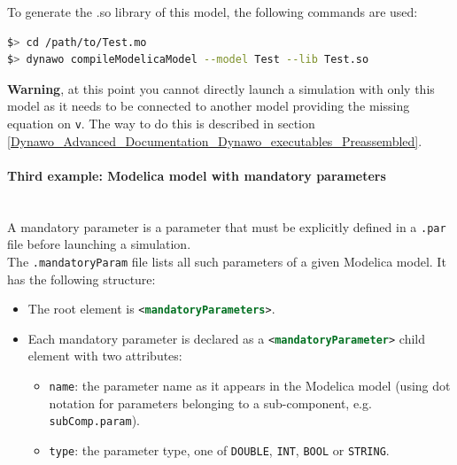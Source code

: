 \documentclass[a4paper, 12pt]{report}
\begin{document}


To generate the .so library of this model, the following commands are used:
\begin{lstlisting}[language=bash,deletekeywords={jobs,help}]
$> cd /path/to/Test.mo
$> dynawo compileModelicaModel --model Test --lib Test.so
\end{lstlisting}

\textbf{Warning}, at this point you cannot directly launch a simulation with only this model as it needs to be connected to another model providing the missing equation on \lstinline[language=Modelica]{v}. The way to do this is described in section \ref{Dynawo_Advanced_Documentation_Dynawo_executables_Preassembled}.

\paragraph{Third example: Modelica model with mandatory parameters}
\label{Dynawo_Advanced_Documentation_Dynawo_executables_execDynawo_third_example}
~~\\
A mandatory parameter is a parameter that must be explicitly defined in a \lstinline[language=bash]{.par} file before launching a simulation. \\

The \lstinline[language=bash]{.mandatoryParam} file lists all such parameters of a given Modelica model. It has the following structure:
\begin{itemize}
  \item The root element is \lstinline[language=XML]{<mandatoryParameters>}.
  \item Each mandatory parameter is declared as a \lstinline[language=XML]{<mandatoryParameter>} child element with two attributes:
  \begin{itemize}
    \item \lstinline[language=XML]{name}: the parameter name as it appears in the Modelica model (using dot notation for parameters belonging to a sub-component, e.g. \lstinline[language=Modelica]{subComp.param}).
    \item \lstinline[language=XML]{type}: the parameter type, one of \lstinline[language=XML]{DOUBLE}, \lstinline[language=XML]{INT}, \lstinline[language=XML]{BOOL} or \lstinline[language=XML]{STRING}.
  \end{itemize}
\end{itemize}
\end{document}
